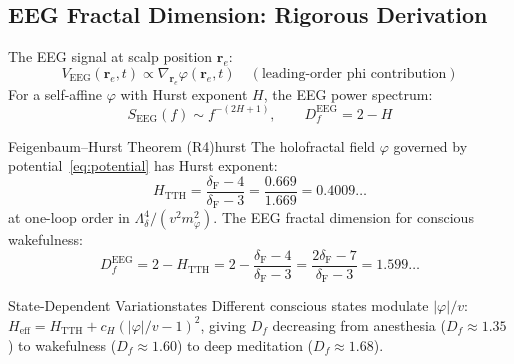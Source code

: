 \documentclass[12pt,a4paper]{article}
\newcommand{\Feig}{\delta_{\mathrm{F}}}
\newcommand{\Hurst}{H_{\mathrm{TTH}}}
\numberwithin{equation}{section}
\begin{document}
\subsection{EEG Fractal Dimension: Rigorous Derivation}

The EEG signal at scalp position $\mathbf{r}_e$:
\begin{equation}
  V_{\mathrm{EEG}}(\mathbf{r}_e,t) \propto \nabla_{\mathbf{r}_e}\varphi(\mathbf{r}_e,t)
  \quad (\text{leading-order phi contribution})
  \label{eq:EEG_phi}
\end{equation}
For a self-affine $\varphi$ with Hurst exponent $H$, the EEG power spectrum:
\begin{equation}
  S_{\mathrm{EEG}}(f) \sim f^{-(2H+1)},
  \qquad
  D_f^{\mathrm{EEG}} = 2 - H
  \label{eq:EEG_spectrum}
\end{equation}

\begin{theorem}{Feigenbaum--Hurst Theorem (R4)}{hurst}
The holofractal field $\varphi$ governed by potential~\eqref{eq:potential} has
Hurst exponent:
\begin{equation}
  \Hurst = \frac{\Feig - 4}{\Feig - 3} = \frac{0.669}{1.669} = 0.4009\ldots
  \label{eq:H_TTH}
\end{equation}
at one-loop order in $\Lambda_\delta^4/(v^2 m_\varphi^2)$.
The EEG fractal dimension for conscious wakefulness:
\begin{equation}
  \boxed{D_f^{\mathrm{EEG}} = 2 - \Hurst = 2 - \frac{\Feig-4}{\Feig-3}
  = \frac{2\Feig - 7}{\Feig - 3} = 1.599\ldots}
  \label{eq:Df_prediction}
\end{equation}
\end{theorem}

\begin{corollary}{State-Dependent Variation}{states}
Different conscious states modulate $|\varphi|/v$:
$H_{\mathrm{eff}} = \Hurst + c_H(|\varphi|/v - 1)^2$,
giving $D_f$ decreasing from anesthesia ($D_f \approx 1.35$)
to wakefulness ($D_f \approx 1.60$) to deep meditation ($D_f \approx 1.68$).
\end{corollary}
\end{document}
